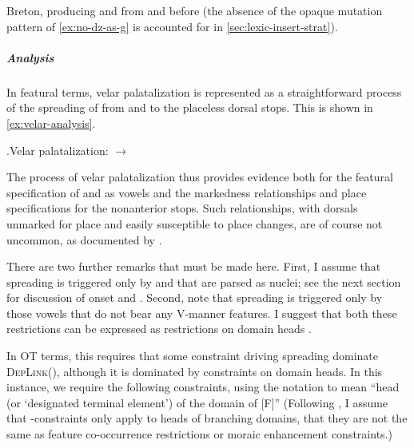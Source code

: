 Breton, producing \ipa{[ʧ]} and \ipa{[dʒ]} from \ipa{[k]} and \ipa{[ɡ]} before \ipa{[i~y]} (the absence of the opaque mutation pattern of \cref{ex:no-dz-as-g} is accounted for in \cref{sec:lexic-insert-strat}).

\subparagraph{Analysis}
\label{sec:analysis-1}

In featural terms, velar palatalization is represented as a straightforward process of the spreading of  from \ipa{[i]} and \ipa{[y]} to the placeless dorsal stops. This is shown in \cref{ex:velar-analysis}.

\ex.\label{ex:velar-analysis}Velar palatalization:  $\rightarrow$ \ipa{[ʧi]}\\


The process of velar palatalization thus provides evidence both for the featural specification of \ipa{[i]} and \ipa{[y]} as  vowels and the markedness relationships and place specifications for the nonanterior stops. Such relationships, with dorsals unmarked for place and easily susceptible to place changes, are of course not uncommon, as documented by \citet[\eg][]{rice96:_defaul_variab,rice03:_featur}.

There are two further remarks that must be made here. First, I assume that spreading is triggered only by \ipa{[i]} and \ipa{[y]} that are parsed as nuclei; see the next section for discussion of onset \ipa{[i]} and \ipa{[y]}. Second, note that spreading is triggered only by those  vowels that do not bear any V-manner features. I suggest that both these restrictions can be expressed as restrictions on domain heads \citep{kenstowicz1997,moren01:_distin,delacy2002,lacy04:_marked_optim_theor,delacy2006,jurgec10:_featur_spread}.

In OT terms, this requires that some constraint driving spreading dominate \textsc{DepLink}(), although it is dominated by constraints on domain heads. In this instance, we require the following constraints, using the notation  to mean \enquote{head (or \enquote{designated terminal element}) of the domain of [F]} (Following \citealt{jurgec10:_featur_spread}, I assume that \dte-constraints only apply to heads of branching domains, \ie that they are not the same as feature co-occurrence restrictions or moraic enhancement constraints.)


